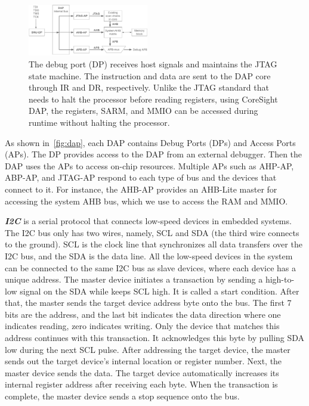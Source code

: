 \begin{figure}[ht]
	\includegraphics[width=0.47\textwidth]{figures/dap}
	\centering
	\caption{The debug port (DP) receives host signals and maintains the JTAG state machine. The instruction and data are sent to the DAP core through IR and DR, respectively. Unlike the JTAG standard that needs to halt the processor before reading registers, using CoreSight DAP, the registers, SARM, and MMIO can be accessed during runtime without halting the processor.}
	\label{fig:dap}
\end{figure}


As shown in~\autoref{fig:dap}, each DAP contains Debug Ports (DPs) and Access Ports (APs). The DP provides access to the DAP from an external debugger. Then the DAP uses the APs to access on-chip resources. Multiple APs such as AHP-AP, ABP-AP, and JTAG-AP respond to each type of bus and the devices that connect to it. For instance, the AHB-AP provides an AHB-Lite master for accessing the system AHB bus, which we use to access the RAM and MMIO.


\textbf{\textit{I2C}} is a serial protocol that connects low-speed devices in embedded systems. The I2C bus only has two wires, namely, SCL and SDA (the third wire connects to the ground). SCL is the clock line that synchronizes all data transfers over the I2C bus, and the SDA is the data line. All the low-speed devices in the system can be connected to the same I2C bus as slave devices, where each device has a unique address. The master device initiates a transaction by sending a high-to-low signal on the SDA while keeps SCL high. It is called a start condition. After that, the master sends the target device address byte onto the bus. The first 7 bits are the address, and the last bit indicates the data direction where one indicates reading, zero indicates writing. Only the device that matches this address continues with this transaction. It acknowledges this byte by pulling SDA low during the next SCL pulse. After addressing the target device, the master sends out the target device's internal location or register number. Next, the master device sends the data. The target device automatically increases its internal register address after receiving each byte. When the transaction is complete, the master device sends a stop sequence onto the bus.
